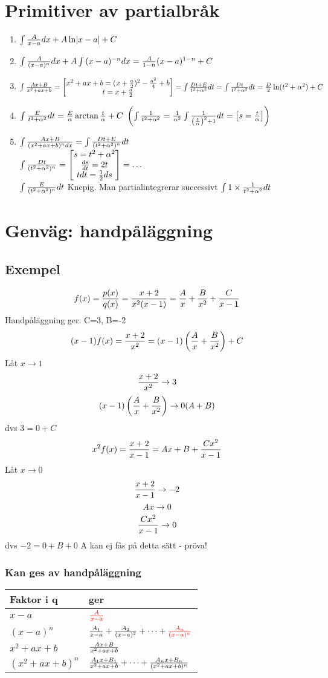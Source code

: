 \documentclass{article}
\newcommand{\xa}{x-a}
\newcommand{\xan}[1]{(\xa)^{#1}}
\newcommand{\xab}{x^2+ax+b}
\newcommand{\xabn}[1]{(\xab)^{#1}}
\begin{document}
\section{Primitiver av partialbråk}
\begin{enumerate}
    \item $\int{\frac{A}{x-a} dx} + A\ln\lvert x-a\rvert +C$
    \item $\int{\frac{A}{(x-a)^n} dx} + A\int{(x-a)^{-n}dx} = \frac{A}{1-n}(x-a)^{1-n} + C $
    \item $\int{\f{Ax+B}{\xab}} = \bmat{\xab = (x+\f a2)^2 - \f {a^2}4 + b \\ t =x+\f a2} =
      \int{\f{Dt+E}{t^2+\alpha^2} dt} = \int{\f{Dt}{t^2+\alpha^2}dt}= \f D2 \ln(t^2+\alpha^2) + C$
    \item $\int{\frac{E}{t^2+\alpha^2} dt} = \frac{E}{\alpha} \arctan \frac{t}{\alpha} + C\ \left(\int{\frac{1}{t^2+\alpha^2}} = \frac{1}{\alpha^2}\int{\frac{1}{\left(\frac{t}{\alpha}\right)^2 + 1}dt} = \left[\begin{matrix}s=\frac{t}{\alpha}\end{matrix}\right]\right)$
    \item $\int{\f{Ax+B}{\xabn{n} dx} = \int{\f{Dt+E}{(t^2+\alpha^2)^n}dt}}$\\
      $\int{\frac{Dt}{(t^2+\alpha^2)^n} = \left[\begin{matrix}s=t^2+\alpha^2 \\ \frac{ds}{dt} = 2t \\ tdt = \frac{1}{2} ds\end{matrix}\right] = \dots}$\\
      $\int{\frac{E}{(t^2+\alpha^2)^n}dt}$ Knepig. Man partialintegrerar successivt $\int{1\times\frac{1}{t^2+\alpha^2}dt}$
\end{enumerate}

\section{Genväg: handpåläggning}
\subsection{Exempel}
$$ f(x) = \frac{p(x)}{q(x)} = \frac{x+2}{x^2(x-1)} = \frac{A}{x} + \frac{B}{x^2} + \frac{C}{x-1} $$
Handpåläggning ger: C=3, B=-2\\
$$ (x-1)f(x) = \frac{x+2}{x^2} = (x-1)\left(\frac{A}{x} + \frac{B}{x^2}\right) + C $$
Låt $x\to 1$
$$ \frac{x+2}{x^2}\to 3$$
$$(x-1)\left(\frac{A}{x} + \frac{B}{x^2}\right) \to 0(A+B) $$
dvs $3=0+C$
$$x^2f(x) = \frac{x+2}{x-1} = Ax+B + \frac{Cx^2}{x-1}$$
Låt $x\to 0$
$$\frac{x+2}{x-1} \to -2$$
$$Ax\to 0$$
$$ \frac{Cx^2}{x-1} \to 0$$
dvs $-2 = 0+B+0$
A kan ej fås på detta sätt - pröva!

\subsubsection{Kan ges av handpåläggning}
\begin{tabular}{ l l }
  Faktor i q & ger \\\hline
  $\xa$ & ${\color{red}\f{A}{\xa}}$\\
  $\xan{n}$ & $\f{A_1}{\xa}+\f{A_2}{\xan{2}}+\cdots+{\color{red}\f{A_n}{\xan{n}}}$\\
  $\xab$ & $\f{Ax+B}{\xab}$\\
  $\xabn{n}$ & $\f{A_1x+B_1}{\xab}+\cdots+\f{A_nx+B_n}{\xabn{n}}$\\
\end{tabular}
\end{document}
